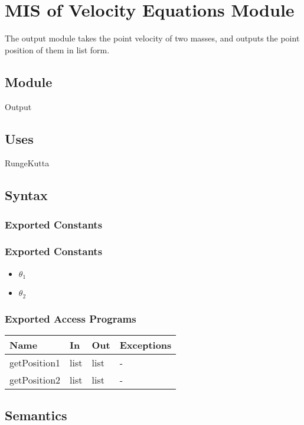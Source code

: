 \documentclass[12pt, titlepage]{article}
\begin{document}
\section{MIS of Velocity Equations Module} \label{VEModule} 
The output module takes the point velocity of two masses, and outputs the point position of them in list form.

\subsection{Module}
Output

\subsection{Uses}
RungeKutta

\subsection{Syntax}

\subsubsection{Exported Constants}
\subsubsection{Exported Constants}
\begin{itemize}
  \item ${\theta_1}$
  \item ${\theta_2}$
\end{itemize}

\subsubsection{Exported Access Programs}

\begin{center}
\begin{tabular}{p{2cm} p{4cm} p{4cm} p{2cm}}
\hline
\textbf{Name} & \textbf{In} & \textbf{Out} & \textbf{Exceptions} \\
\hline
getPosition1 & list & list & - \\
\hline
getPosition2 & list & list & - \\
\hline
\end{tabular}
\end{center}

\subsection{Semantics}
\end{document}

